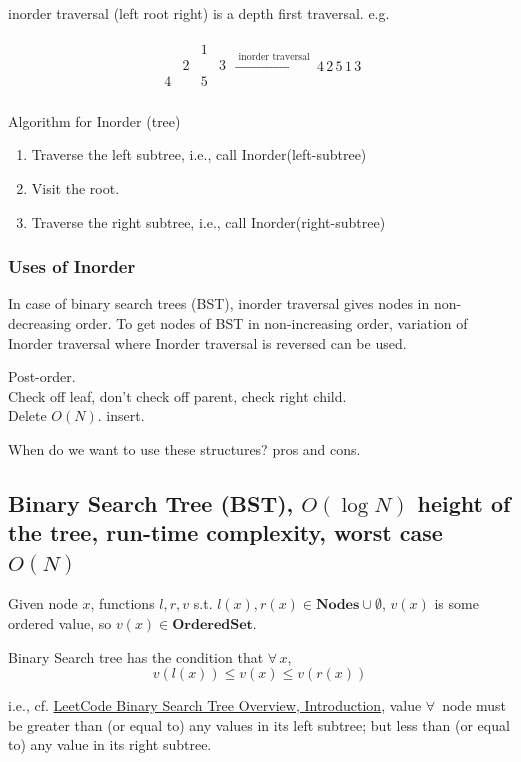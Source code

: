 \documentclass[10pt]{amsart}
\begin{document}
inorder traversal (left root right) is a depth first traversal. e.g.

\[
\begin{gathered}
\begin{matrix}
& & 1 & \\
& 2 & & 3 \\
4 & & 5 & \\
\end{matrix} \xrightarrow{ \text{ inorder traversal } } 4 \, 2 \, 5 \, 1 \, 3
\end{gathered}
\]

Algorithm for Inorder (tree)
\begin{enumerate}
	\item Traverse the left subtree, i.e., call Inorder(left-subtree)
	\item Visit the root.
	\item Traverse the right subtree, i.e., call Inorder(right-subtree)
\end{enumerate}

\subsubsection{Uses of Inorder} In case of binary search trees (BST), inorder traversal gives nodes in non-decreasing order. To get nodes of BST in non-increasing order, variation of Inorder traversal where Inorder traversal is reversed can be used.


Post-order. \\
Check off leaf, don't check off parent, check right child. \\

Delete $O(N)$.
insert.

When do we want to use these structures? pros and cons.

\subsection{Binary Search Tree (BST), $O(\log{N})$ height of the tree, run-time complexity, worst case $O(N)$}

Given node $x$, functions $l, r, v$ s.t. $l(x), r(x) \in \textbf{Nodes} \cup \emptyset$, $v(x)$ is some ordered value, so $v(x) \in \textbf{OrderedSet}$. 

Binary Search tree has the condition that $\forall \, x$, 
\[
v(l(x)) \leq v(x) \leq v(r(x))
\]

i.e., cf. \href{https://leetcode.com/explore/learn/card/introduction-to-data-structure-binary-search-tree/}{LeetCode Binary Search Tree Overview, Introduction}, value $\forall \, $ node must be greater than (or equal to) any values in its left subtree; but less than (or equal to) any value in its right subtree.
\end{document}
